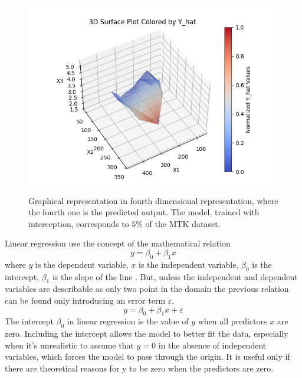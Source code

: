 \documentclass[9pt,technote]{IEEEtran}
\begin{document}
		\begin{figure}
			\centering
  			\includegraphics[width=1\linewidth]{figures/mkt4dim_with_intercept.png}
  			\caption{Graphical representation in fourth dimensional representation, where the fourth one is the predicted output. The model, trained with interception, corresponds to $5\%$ of the MTK dataset.}
  			\label{fig::mkt4dim_with_intercept}
		\end{figure}	
		
	Linear regression use the concept of the mathematical relation  
		\begin{equation*}
			y = \beta_0 + \beta_1 x
		\end{equation*}
	where  $y$  is the dependent variable,  $x$  is the independent variable, $\beta_0$  is the intercept,  $\beta_1$  is the slope of the line \cite{james2021LinearRegression}. But, unless the independent and dependent variables are describable as only two point in the domain the previous relation can be found only introducing an error term $\varepsilon$.
		\begin{equation}
			y = \beta_0 + \beta_1 x + \varepsilon
		\end{equation}
	The intercept $\beta_0$ in linear regression is the value of $y$ when all predictors $x$ are zero. Including the intercept allows the model to better fit the data, especially when it’s unrealistic to assume that $y = 0$ in the absence of independent variables, which forces the model to pass through the origin. It is useful only if there are theoretical reasons for y to be zero when the predictors are zero.
	
\end{document}
